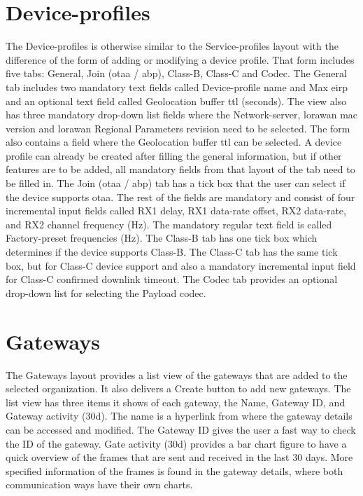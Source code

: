 \section{Device-profiles}
The Device-profiles is otherwise similar to the Service-profiles layout with the difference of the form of adding or modifying a device profile.
That form includes five tabs: General, Join (\gls{otaa} / \gls{abp}), Class-B, Class-C and Codec.
The General tab includes two mandatory text fields called Device-profile name and Max \gls{eirp} and an optional text field called Geolocation buffer \gls{ttl} (seconds).
The view also has three mandatory drop-down list fields where the Network-server, \gls{lorawan} \gls{mac} version and \gls{lorawan} Regional Parameters revision need to be selected.
The form also contains a field where the Geolocation buffer \gls{ttl} can be selected.
A device profile can already be created after filling the general information, but if other features are to be added, all mandatory fields from that layout of the tab need to be filled in.
The Join (\gls{otaa} / \gls{abp}) tab has a tick box that the user can select if the device supports \gls{otaa}.
The rest of the fields are mandatory and consist of four incremental input fields called RX1 delay, RX1 data-rate offset, RX2 data-rate, and RX2 channel frequency (Hz).
The mandatory regular text field is called Factory-preset frequencies (Hz).
The Class-B tab has one tick box which determines if the device supports Class-B.
The Class-C tab  has the same tick box, but for Class-C device support and also a mandatory incremental input field for Class-C confirmed downlink timeout.
The Codec tab provides an optional drop-down list for selecting the Payload codec.

\section{Gateways}
The Gateways layout provides a list view of the gateways that are added to the selected organization. 
It also delivers a Create button to add new gateways.
The list view has three items it shows of each gateway, the Name, Gateway ID, and Gateway activity (30d).
The name is a hyperlink from where the gateway details can be accessed and modified.
The Gateway ID gives the user a fast way to check the ID of the gateway. 
Gate activity (30d) provides a bar chart figure to have a quick overview of the frames that are sent and received in the last 30 days.
More specified information of the frames is found in the gateway details, where both communication ways have their own charts.

